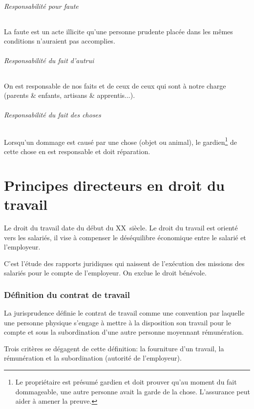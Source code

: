 \documentclass[10pt,a4paper]{article}
\begin{document}
\paragraph{Responsabilité pour faute} La faute est un acte illicite qu'une personne prudente placée dans les mêmes conditions n'auraient pas accomplies.

\paragraph{Responsabilité du fait d'autrui} On est responsable de nos faits et de ceux de ceux qui sont à notre charge (parents \& enfants, artisans \& apprentis...).

\paragraph{Responsabilité du fait des choses} Lorsqu'un dommage est causé par une chose (objet ou animal), le gardien\footnote{Le propriétaire est présumé gardien et doit prouver qu'au moment du fait dommageable, une autre personne avait la garde de la chose. L'assurance peut aider à amener la preuve.} de cette chose en est responsable et doit réparation.

\part{Principes directeurs en droit du travail}

Le droit du travail date du début du XX\ieme ~siècle. Le droit du travail est orienté vers les salariés, il vise à compenser le déséquilibre économique entre le salarié et l'employeur.

C'est l'étude des rapports juridiques qui naissent de l'exécution des missions des salariés pour le compte de l'employeur. On exclue le droit bénévole.

\section{Définition du contrat de travail}

La jurisprudence définie le contrat de travail comme une convention par laquelle une personne physique s'engage à mettre à la disposition son travail pour le compte et sous la subordination d'une autre personne moyennant rémunération.

Trois critères se dégagent de cette définition: la fourniture d'un travail, la rémunération et la subordination (autorité de l'employeur).
\end{document}
